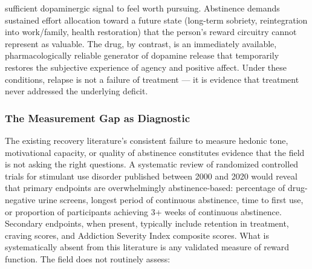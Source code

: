 sufficient dopaminergic signal to feel worth pursuing. Abstinence demands sustained effort allocation toward a future state (long-term sobriety, reintegration into work/family, health restoration) that the person's reward circuitry cannot represent as valuable. The drug, by contrast, is an immediately available, pharmacologically reliable generator of dopamine release that temporarily restores the subjective experience of agency and positive affect. Under these conditions, relapse is not a failure of treatment --- it is evidence that treatment never addressed the underlying deficit.

\subsubsection{The Measurement Gap as Diagnostic}\label{18_restoration-the-measurement-gap-as-diagnostic}

The existing recovery literature's consistent failure to measure hedonic tone, motivational capacity, or quality of abstinence constitutes evidence that the field is not asking the right questions. A systematic review of randomized controlled trials for stimulant use disorder published between 2000 and 2020 would reveal that primary endpoints are overwhelmingly abstinence-based: percentage of drug-negative urine screens, longest period of continuous abstinence, time to first use, or proportion of participants achieving 3+ weeks of continuous abstinence. Secondary endpoints, when present, typically include retention in treatment, craving scores, and Addiction Severity Index composite scores. What is systematically absent from this literature is any validated measure of reward function. The field does not routinely assess:

